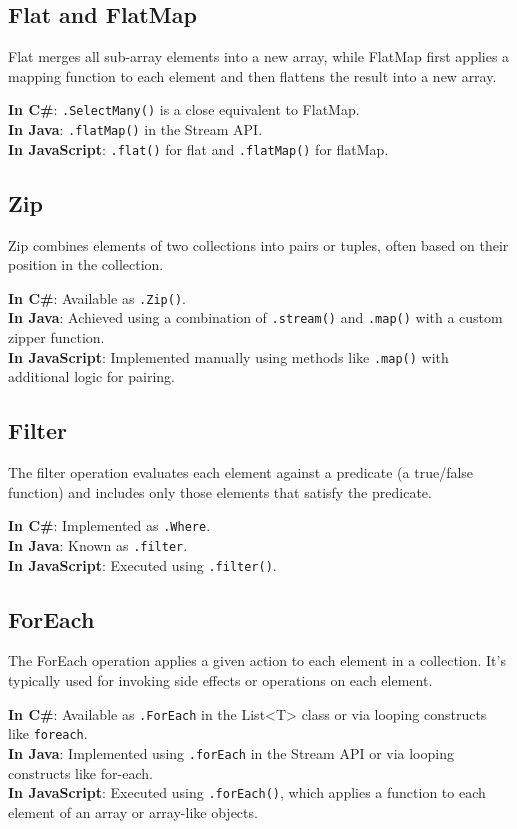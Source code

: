 \subsection*{Flat and FlatMap}
Flat merges all sub-array elements into a new array, while FlatMap first applies a mapping function to each element and then flattens the result into a new array.

\textbf{In C\#}: \texttt{.SelectMany()} is a close equivalent to FlatMap. \\
\textbf{In Java}: \texttt{.flatMap()} in the Stream API. \\
\textbf{In JavaScript}: \texttt{.flat()} for flat and \texttt{.flatMap()} for flatMap.

\subsection*{Zip}
Zip combines elements of two collections into pairs or tuples, often based on their position in the collection.

\textbf{In C\#}: Available as \texttt{.Zip()}. \\
\textbf{In Java}: Achieved using a combination of \texttt{.stream()} and \texttt{.map()} with a custom zipper function. \\
\textbf{In JavaScript}: Implemented manually using methods like \texttt{.map()} with additional logic for pairing.

\subsection*{Filter}
The filter operation evaluates each element against a predicate (a true/false function) and includes only those elements that satisfy the predicate.

\textbf{In C\#}: Implemented as \texttt{.Where}. \\
\textbf{In Java}: Known as \texttt{.filter}. \\
\textbf{In JavaScript}: Executed using \texttt{.filter()}.

\subsection*{ForEach}
The ForEach operation applies a given action to each element in a collection. It's typically used for invoking side effects or operations on each element.

\textbf{In C\#}: Available as \texttt{.ForEach} in the List<T> class or via looping constructs like \texttt{foreach}. \\
\textbf{In Java}: Implemented using \texttt{.forEach} in the Stream API or via looping constructs like for-each. \\
\textbf{In JavaScript}: Executed using \texttt{.forEach()}, which applies a function to each element of an array or array-like objects.

